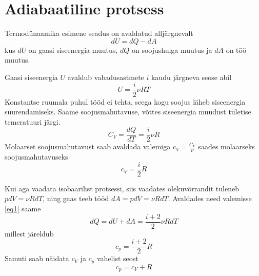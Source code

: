 \documentclass{trkut}%
\begin{document}
\section{Adiabaatiline protsess}
Termodünaamika esimene seadus on avaldatud alljärgnevalt
\begin{equation}\label{eq1}
dU = dQ - dA
\end{equation}
kus $dU$ on gaasi siseenergia muutus, $dQ$ on soojushulga muutus ja $dA$ on töö muutus.

Gaasi siseenergia $U$ avaldub vabadusastmete $i$ kaudu järgneva seose abil
\begin{equation}\label{eq5}
U = \frac{i}{2} \nu R T
\end{equation}
Konstantse ruumala puhul tööd ei tehta, seega kogu soojus läheb siseenergia suurendamiseks. Saame soojusmahutavuse, võttes siseenergia muudust tuletise temeratuuri järgi.
\begin{equation}\label{eq6}
C_V = \frac{dQ}{dT}=\frac{i}{2}\nu R
\end{equation}
Molaarset soojusmahutavust saab avaldada valemiga $c_V = \frac{C_V}{\nu}$ saades molaarseks soojusmahutavuseks
\begin{equation}\label{eq7}
c_V = \frac{i}{2}R
\end{equation}

Kui aga vaadata isobaarilist protsessi, siis vaadates olekuvõrrandit tuleneb $pdV=\nu RdT$, ning gaas teeb tööd $dA = pdV = \nu RdT$. Avaldades need valemisse \ref{eq1} saame
\begin{equation*}
dQ = dU + dA = \frac{i+2}{2} \nu R dT
\end{equation*}
millest järeldub
\begin{equation*}
c_p=\frac{i+2}{2}R
\end{equation*}
Samuti saab näidata $c_V$ ja $c_p$ vahelist seost
\begin{equation}\label{eq9}
c_p = c_V + R
\end{equation}
\end{document}
